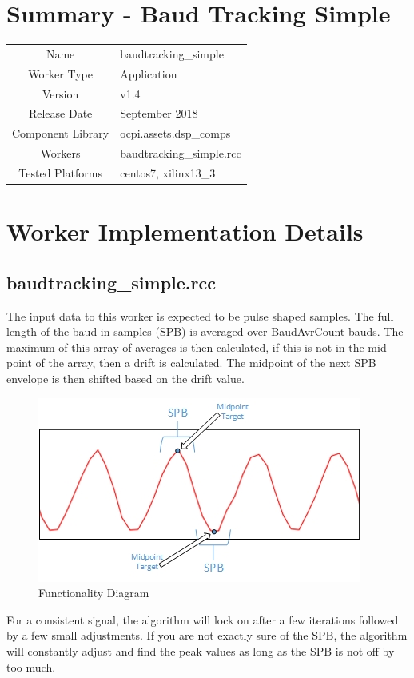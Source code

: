 \documentclass{article}
\author{} %
\date{Version \docVersion} %
\title{\docTitle}
\def\docVersion{1.4}
\def\comp{baudtracking\_simple}
\def\Comp{Baud Tracking Simple}
\begin{document}
\section*{Summary - \Comp}
\begin{tabular}{|c|M{13.5cm}|}
	\hline
	                  &                                          \\
	\hline
	Name              & \comp                                    \\
	\hline
	Worker Type       & Application                              \\
	\hline
	Version           & v\docVersion \\
	\hline
	Release Date      & September 2018 \\
	\hline
	Component Library & ocpi.assets.dsp\_comps                    \\
	\hline
	Workers           & \comp.rcc                                \\
	\hline
	Tested Platforms  & centos7, xilinx13\_3 \\
	\hline
\end{tabular}
\section*{Worker Implementation Details}
\subsection*{\comp.rcc}
\begin{flushleft}
	The input data to this worker is expected to be pulse shaped samples.  The full length of the baud in samples (SPB) is averaged over BaudAvrCount bauds.  The maximum of this array of averages is then calculated, if this is not in the mid point of the array, then a drift is calculated.  The midpoint of the next SPB envelope is then shifted based on the drift value.\par\medskip

	\begin{figure}[h]
		\centering
		\includegraphics[scale=.75]{baudtracker_signal}
		\caption{Functionality Diagram}
		\label{fig:sig}
	\end{figure}

	For a consistent signal, the algorithm will lock on after a few iterations followed by a few small adjustments. If you are not exactly sure of the SPB, the algorithm will constantly adjust and find the peak values as long as the SPB is not off by too much.
\end{flushleft}
\end{document}
